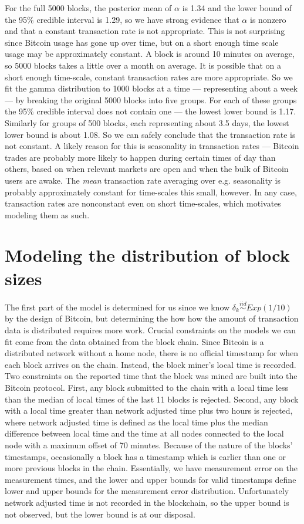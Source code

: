 \documentclass{article}
\begin{document}
For the full 5000 blocks, the posterior mean of $\alpha$ is 1.34 and the lower bound of the 95\% credible interval is 1.29, so we have strong evidence that $\alpha$ is nonzero and that a constant transaction rate is not appropriate. This is not surprising since Bitcoin usage has gone up over time, but on a short enough time scale usage may be approximately constant. A block is around 10 minutes on average, so 5000 blocks takes a little over a month on average. It is possible that on a short enough time-scale, constant transaction rates are more appropriate. So we fit the gamma distribution to 1000 blocks at a time --- representing about a week --- by breaking the original 5000 blocks into five groups. For each of these groups the 95\% credible interval does not contain one --- the lowest lower bound is 1.17. Similarly for groups of 500 blocks, each representing about 3.5 days, the lowest lower bound is about 1.08. So we can safely conclude that the transaction rate is not constant. A likely reason for this is seasonality in transaction rates --- Bitcoin trades are probably more likely to happen during certain times of day than others, based on when relevant markets are open and when the bulk of Bitcoin users are awake. The {\it mean} transaction rate averaging over e.g. seasonality is probably approximately constant for time-scales this small, however. In any case, transaction rates are nonconstant even on short time-scales, which motivates modeling them as such.

\section{Modeling the distribution of block sizes}

The first part of the model is determined for us since we know $\delta_k\stackrel{iid}{\sim} Exp(1/10)$ by the design of Bitcoin, but determining the how how the amount of transaction data is distributed requires more work. Crucial constraints on the models we can fit come from the data obtained from the block chain. Since Bitcoin is a distributed network without a home node, there is no official timestamp for when each block arrives on the chain. Instead, the block miner's local time is recorded. Two constraints on the reported time that the block was mined are built into the Bitcoin protocol. First, any block submitted to the chain with a local time less than the median of local times of the last 11 blocks is rejected. Second, any block with a local time greater than network adjusted time plus two hours is rejected, where network adjusted time is defined as the local time plus the median difference between local time and the time at all nodes connected to the local node with a maximum offset of 70 minutes. Because of the nature of the blocks' timestamps, occasionally a block has a timestamp which is earlier than one or more previous blocks in the chain. Essentially, we have measurement error on the measurement times, and the lower and upper bounds for valid timestamps define lower and upper bounds for the measurement error distribution. Unfortunately network adjusted time is not recorded in the blockchain, so the upper bound is not observed, but the lower bound is at our disposal.
\end{document}

